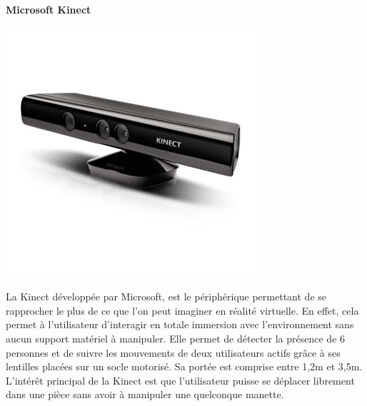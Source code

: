\textbf{Microsoft Kinect}
\\
\noindent\begin{minipage}{0.3\textwidth}
			\includegraphics[width=\linewidth]{1-PreEtude/img/kinect}
			\end{minipage}
			\hfill
			\begin{minipage}{0.65\textwidth}
La Kinect développée par Microsoft, est le périphérique permettant de se rapprocher le plus de ce que l'on peut imaginer en réalité virtuelle. En effet, cela permet à l'utilisateur d'interagir en totale immersion avec l'environnement sans aucun support matériel à manipuler. Elle permet de détecter la présence de 6 personnes et de suivre les mouvements de deux utilisateurs actifs grâce à ses lentilles placées sur un socle motorisé. Sa portée est comprise entre 1,2m et 3,5m. L'intérêt principal de la Kinect est que l'utilisateur puisse se déplacer librement dans une pièce sans avoir à manipuler une quelconque manette.
		\end{minipage}
\\

